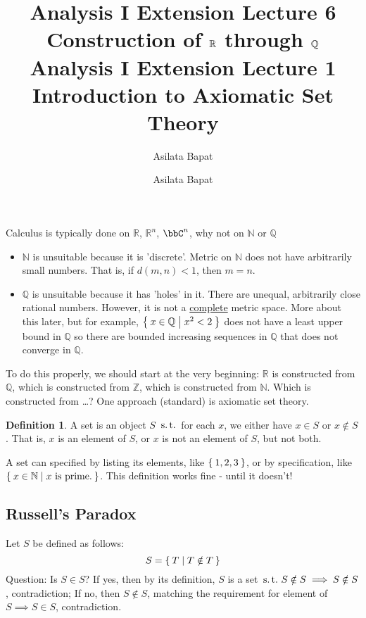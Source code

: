 \documentclass[12pt]{amsart}
\title{Analysis I Extension Lecture 6\\Construction of $\bbR$ through $\bbQ$}
\author{Asilata Bapat}
\title{Analysis I Extension Lecture 1\\Introduction to Axiomatic Set Theory}
\author{Asilata Bapat}
\newcommand{\bbR}{\mathbb{R}}
\newcommand{\bbN}{\mathbb{N}}
\newcommand{\bbZ}{\mathbb{Z}}
\newcommand{\bbQ}{\mathbb{Q}}
\newcommand{\suchthat}{\operatorname{\thinspace s.t. \thinspace}}
\theoremstyle{plain}
\theoremstyle{remark}
\theoremstyle{definition}
\newtheorem*{define}{Definition}
\begin{document}
\maketitle
{}

Calculus is typically done on $\bbR$, $\bbR^n$, $\bbC^n$, why not on $\bbN$ or $\bbQ$
\begin{itemize}[-]
	\item $\bbN$ is unsuitable because it is 'discrete'. Metric on $\bbN$ does not have arbitrarily small numbers. That is, if $d(m,n) < 1$, then $m = n$.
	\item $\bbQ$ is unsuitable because it has 'holes' in it. There are unequal, arbitrarily close rational numbers. However, it is not a 	     \ul{complete} metric space.
	\newline
	More about this later, but for example, $\Set{x \in \bbQ | x^2 < 2}$ does not have a least upper bound in $\bbQ$ so there are bounded increasing sequences in $\bbQ$ that does not converge in $\bbQ$.
\end{itemize}

To do this properly, we should start at the very beginning: $\bbR$ is constructed from $\bbQ$, which is constructed from $\bbZ$, which is constructed from $\bbN$. Which is constructed from \dots ?
\newline
One approach (standard) is axiomatic set theory.
\begin{define}
	A set is an object $S$ $\suchthat$ for each $x$, we either have $x \in S$ or $x \notin S$. That is, $x$ is an element of $S$, or $x$ is not an element of $S$, but not both.
\end{define}
A set can specified by listing its elements, like $\Set{1, 2, 3}$, or by specification, like $\Set{x \in \bbN| x \text{ is prime.}}$. This definition works fine - until it doesn't!
\newline
\subsection*{Russell's Paradox}
Let $S$ be defined as follows:
\begin{equation*}
	S = \Set{T| T \notin T}
\end{equation*}
Question: Is $S \in S$?
\newline
If yes, then by its definition, $S$ is a set $\suchthat S \notin S \implies S \notin S$, contradiction;
If no, then $S \notin S$, matching the requirement for element of $S \implies S \in S$, contradiction.
\end{document}
